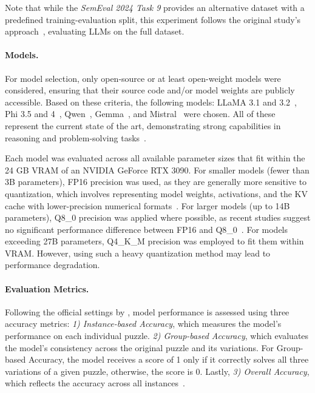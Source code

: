 Note that while the \textit{SemEval 2024 Task 9} provides an alternative dataset with a predefined training-evaluation split, this experiment follows the original study's approach~\cite{jiangBRAINTEASERLateralThinking2023}, evaluating \acp{LLM} on the full dataset.

\paragraph{Models.}
For model selection, only open-source or at least open-weight models were considered, ensuring that their source code and/or model weights are publicly accessible. Based on these criteria, the following models: \ac{LLaMA} 3.1 and 3.2~\cite{grattafioriLlama3Herd2024}, \acs{Phi} 3.5 and 4~\cite{abdinPhi3TechnicalReport2024, abdinPhi4TechnicalReport2024}, \acs{Qwen}~\cite{qwenQwen25TechnicalReport2025}, \acs{Gemma}~\cite{teamGemma2Improving2024}, and \acs{Mistral}~\cite{MistralNeMoMistral} were chosen. All of these represent the current state of the art, demonstrating strong capabilities in reasoning and problem-solving tasks~\cite{grattafioriLlama3Herd2024, abdinPhi3TechnicalReport2024, abdinPhi4TechnicalReport2024, qwenQwen25TechnicalReport2025, teamGemma2Improving2024, MistralNeMoMistral}.

Each model was evaluated across all available parameter sizes that fit within the 24 GB \ac{VRAM} of an NVIDIA GeForce RTX 3090. For smaller models (fewer than 3B parameters), FP16 precision was used, as they are generally more sensitive to quantization, which involves representing model weights, activations, and the KV cache with lower-precision numerical formats~\cite{liEvaluatingQuantizedLarge2024}. For larger models (up to 14B parameters), Q8\_0 precision was applied where possible, as recent studies suggest no significant performance difference between FP16 and Q8\_0~\cite{raubaQuantifyingPerturbationImpacts2024, liEvaluatingQuantizedLarge2024}. For models exceeding 27B parameters, Q4\_K\_M precision was employed to fit them within \ac{VRAM}. However, using such a heavy quantization method may lead to performance degradation.

\paragraph{Evaluation Metrics.}
Following the official settings by \textcite{jiangBRAINTEASERLateralThinking2023}, model performance is assessed using three accuracy metrics: \textit{1) Instance-based Accuracy}, which measures the model's performance on each individual puzzle. \textit{2) Group-based Accuracy}, which evaluates the model's consistency across the original puzzle and its variations. For Group-based Accuracy, the model receives a score of 1 only if it correctly solves all three variations of a given puzzle, otherwise, the score is 0. Lastly, \textit{3) Overall Accuracy}, which reflects the accuracy across all instances~\cite{jiangBRAINTEASERLateralThinking2023}.

